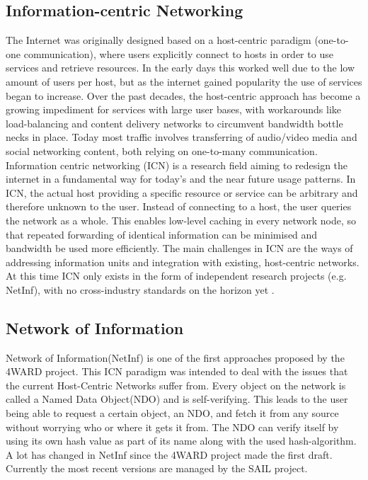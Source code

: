 \subsection{Information-centric Networking}
\label{sec:netinf}
The Internet was originally designed based on a host-centric paradigm (one-to-one communication), where users explicitly connect to hosts in order to use services and retrieve resources. In the early days this worked well due to the low amount of users per host, but as the internet gained popularity the use of services began to increase. Over the past decades, the host-centric approach has become a growing impediment for services with large user bases, with workarounds like load-balancing and content delivery networks to circumvent bandwidth bottle necks in place. Today most traffic involves transferring of audio/video media and social networking content, both relying on one-to-many communication. Information centric networking (ICN) is a research field aiming to redesign the internet in a fundamental way for today's and the near future usage patterns. In ICN, the actual host providing a specific resource or service can be arbitrary and therefore unknown to the user. Instead of connecting to a host, the user queries the network as a whole. This enables low-level caching in every network node, so that repeated forwarding of identical information can be minimised and bandwidth be used more efficiently. The main challenges in ICN are the ways of addressing information units and integration with existing, host-centric networks. At this time ICN only exists in the form of independent research projects (e.g. NetInf), with no cross-industry standards on the horizon yet \cite{ICNarticle}. 


\subsection{Network of Information}
Network of Information(NetInf) is one of the first approaches proposed by the 4WARD project. \cite{4ward} This ICN paradigm was intended to deal with the issues that the current Host-Centric Networks suffer from. Every object on the network is called a Named Data Object(NDO) and is self-verifying. This leads to the user being able to request a certain object, an NDO, and fetch it from any source without worrying who or where it gets it from. The NDO can verify itself by using its own hash value as part of its name along with the used hash-algorithm.
A lot has changed in NetInf since the 4WARD project made the first draft. Currently the most recent versions are managed by the SAIL project. \cite{netinfproto}

